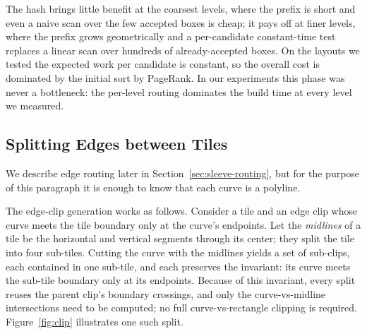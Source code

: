 The hash brings little benefit at the coarsest levels, where the
prefix is short and even a naive scan over the few accepted boxes is
cheap; it pays off at finer levels, where the prefix grows
geometrically and a per-candidate constant-time test replaces a linear
scan over hundreds of already-accepted boxes.  On the layouts we
tested the expected work per candidate is constant, so the overall
cost is dominated by the initial sort by PageRank.  In our experiments
this phase was never a bottleneck: the per-level routing dominates
the build time at every level we measured.


\subsection{Splitting Edges between Tiles}
\label{sec:tile-build}
We describe edge routing later in Section~\ref{sec:sleeve-routing}, but
for the purpose of this paragraph it is enough to know that each curve
is a polyline.

The edge-clip generation works as follows. Consider a tile and an edge
clip whose curve meets the tile boundary only at the curve's
endpoints. Let the \emph{midlines} of a tile be the horizontal and
vertical segments through its center; they split the tile into four
sub-tiles. Cutting the curve with the midlines yields a set of
sub-clips, each contained in one sub-tile, and each preserves the
invariant: its curve meets the sub-tile boundary only at its
endpoints. Because of this invariant, every split reuses the parent
clip's boundary crossings, and only the curve-vs-midline
intersections need to be computed; no full curve-vs-rectangle clipping
is required. Figure~\ref{fig:clip} illustrates one such split.


